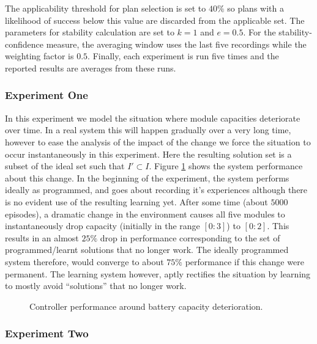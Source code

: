 The applicability threshold for plan selection is set to $40\%$ so plans with a likelihood of success below this value are discarded from the applicable set. The parameters for stability calculation are set to $k=1$ and $e=0.5$. For the stability-confidence measure, the averaging window uses the last five recordings while the weighting factor is $0.5$. Finally, each experiment is run five times and the reported results are averages from these runs.

\subsubsection{Experiment One}

In this experiment we model the situation where module capacities deteriorate over time. In a real system this will happen gradually over a very long time, however to ease the analysis of the impact of the change we force the situation to occur instantaneously in this experiment. Here the resulting solution set is a subset of the ideal set such that $I' \subset I$. Figure \ref{fig:experiment1} shows the system performance about this change. In the beginning of the experiment, the system performs ideally as programmed, and goes about recording it's experiences although there is no evident use of the resulting learning yet. After some time (about $5000$ episodes), a dramatic change in the environment causes all five modules to instantaneously drop capacity (initially in the range $[0:3]$) to $[0:2]$. This results in an almost $25\%$ drop in performance corresponding to the set of programmed/learnt solutions that no longer work. The ideally programmed system therefore, would converge to about $75\%$ performance if this change were permanent. The learning system however, aptly rectifies the situation by learning to mostly avoid ``solutions'' that no longer work. 

\begin{figure}[ht]
\begin{center}

\end{center}
\caption{Controller performance around battery capacity deterioration.}
\label{fig:experiment1}
\end{figure}

\subsubsection{Experiment Two}

